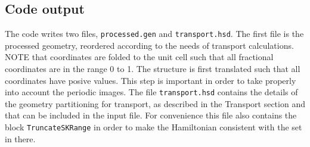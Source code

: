 \subsection{Code output}

The code writes two files, \verb|processed.gen| and \verb|transport.hsd|. The first file is the 
processed geometry, reordered according to the needs of transport calculations. 
NOTE that coordinates are folded to the unit cell such that all fractional coordinates are in the 
range 0 to 1. The structure is first translated such that all coordinates  have posive values. 
This step is important in order to take properly into account the periodic images.
The file \verb|transport.hsd| contains the details of the geometry partitioning for transport, 
as described in the Transport section and that can be included in the input file.
For convenience this file also contains the block \verb|TruncateSKRange| in order to 
make the Hamiltonian consistent with the  set in there. 


